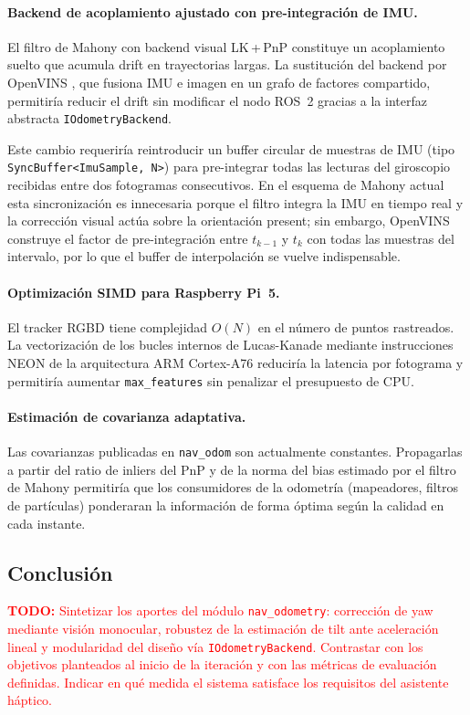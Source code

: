 \paragraph{Backend de acoplamiento ajustado con pre-integración de IMU.}
El filtro de Mahony con backend visual LK\,+\,PnP constituye un acoplamiento
suelto que acumula drift en trayectorias largas. La sustitución del backend
por OpenVINS \cite{Mourikis2007}, que fusiona IMU e imagen en un grafo de
factores compartido, permitiría reducir el drift sin modificar el nodo ROS~2
gracias a la interfaz abstracta \texttt{IOdometryBackend}.

Este cambio requeriría reintroducir un buffer circular de muestras de IMU
(tipo \texttt{SyncBuffer<ImuSample,~N>}) para pre-integrar todas las lecturas
del giroscopio recibidas entre dos fotogramas consecutivos. En el esquema de
Mahony actual esta sincronización es innecesaria porque el filtro integra la
IMU en tiempo real y la corrección visual actúa sobre la orientación present;
sin embargo, OpenVINS construye el factor de pre-integración entre
$t_{k-1}$ y $t_k$ con todas las muestras del intervalo, por lo que el buffer
de interpolación se vuelve indispensable.

\paragraph{Optimización SIMD para Raspberry Pi~5.}
El tracker RGBD tiene complejidad $O(N)$ en el número de puntos rastreados.
La vectorización de los bucles internos de Lucas-Kanade mediante instrucciones
NEON de la arquitectura ARM Cortex-A76 \cite{RaspberryPi} reduciría la
latencia por fotograma y permitiría aumentar \texttt{max\_features} sin
penalizar el presupuesto de CPU.

\paragraph{Estimación de covarianza adaptativa.}
Las covarianzas publicadas en \texttt{nav\_odom} son actualmente constantes.
Propagarlas a partir del ratio de inliers del PnP y de la norma del bias
estimado por el filtro de Mahony permitiría que los consumidores de la
odometría (mapeadores, filtros de partículas) ponderaran la información de
forma óptima según la calidad en cada instante.

\subsection{Conclusión}
\label{sec:lm-vio-conclusion}

\textcolor{red}{\textbf{TODO:} Sintetizar los aportes del módulo \texttt{nav\_odometry}:
corrección de yaw mediante visión monocular, robustez de la estimación de tilt
ante aceleración lineal y modularidad del diseño vía \texttt{IOdometryBackend}.
Contrastar con los objetivos planteados al inicio de la iteración y con las
métricas de evaluación definidas. Indicar en qué medida el sistema satisface
los requisitos del asistente háptico.}
